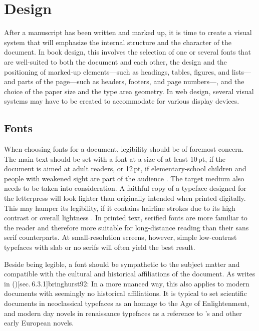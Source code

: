 \chapter{Design}
After a manuscript has been written and marked up, it is time to create a visual
system that will emphasize the internal structure and the character of the
document. In book design, this involves the selection of one or several fonts
that are well-suited to both the document and each other, the design and the
positioning of marked-up elements---such as headings, tables, figures, and
lists---and parts of the page---such as headers, footers, and page numbers---,
and the choice of the paper size and the type area geometry. In web design,
several visual systems may have to be created to accommodate for various display
devices.

\section{Fonts}
When choosing fonts for a document, legibility should be of foremost concern.
The main text should be set with a font at a size of at least 10\,pt, if the
document is aimed at adult readers, or 12\,pt, if elementary-school children and
people with weakened sight are part of the audience
\cite[para.\,13--15]{kapr99}. The target medium also needs to be taken into
consideration. A faithful copy of a typeface designed for the letterpress will
look lighter than originally intended when printed digitally. This may hamper
its legibility, if it contains hairline strokes due to its high contrast or
overall lightness \cite[sec.~6.1.2]{bringhurst92}. In printed text, serified
fonts are more familiar to the reader and therefore more suitable for
long-distance reading than their sans serif counterparts. At small-resolution
screens, however, simple low-contrast typefaces with slab or no serifs will
often yield the best result.

Beside being legible, a font should be sympathetic to the subject matter and
compatible with the cultural and historical affiliations of the document. As
 writes in \citework*()[sec.\,6.3.1]{bringhurst92}:
 In a more nuanced way, this also applies to modern
documents with seemingly no historical affiliations. It is typical to set
scientific documents in neoclassical typefaces as an homage to the Age of
Enlightenment, and modern day novels in renaissance typefaces as a reference to
's  and other early
European novels.

